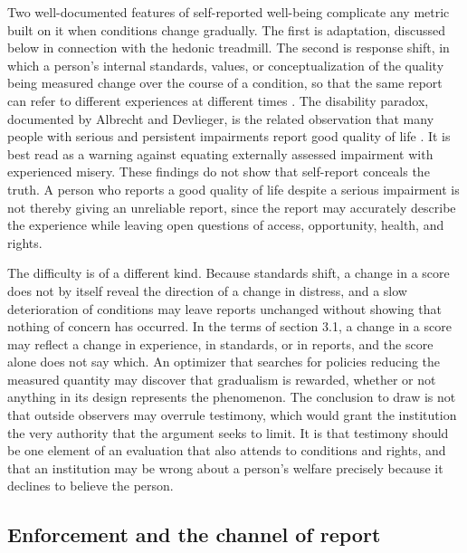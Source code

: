 \documentclass[11pt]{article}
\begin{document}
Two well-documented features of self-reported well-being complicate any metric built on it when conditions change gradually. The first is adaptation, discussed below in connection with the hedonic treadmill. The second is response shift, in which a person's internal standards, values, or conceptualization of the quality being measured change over the course of a condition, so that the same report can refer to different experiences at different times \citep{sprangers1999}. The disability paradox, documented by Albrecht and Devlieger, is the related observation that many people with serious and persistent impairments report good quality of life \citep{albrecht1999}. It is best read as a warning against equating externally assessed impairment with experienced misery. These findings do not show that self-report conceals the truth. A person who reports a good quality of life despite a serious impairment is not thereby giving an unreliable report, since the report may accurately describe the experience while leaving open questions of access, opportunity, health, and rights.

The difficulty is of a different kind. Because standards shift, a change in a score does not by itself reveal the direction of a change in distress, and a slow deterioration of conditions may leave reports unchanged without showing that nothing of concern has occurred. In the terms of section 3.1, a change in a score may reflect a change in experience, in standards, or in reports, and the score alone does not say which. An optimizer that searches for policies reducing the measured quantity may discover that gradualism is rewarded, whether or not anything in its design represents the phenomenon. The conclusion to draw is not that outside observers may overrule testimony, which would grant the institution the very authority that the argument seeks to limit. It is that testimony should be one element of an evaluation that also attends to conditions and rights, and that an institution may be wrong about a person's welfare precisely because it declines to believe the person.

\subsection{Enforcement and the channel of report}
\end{document}

